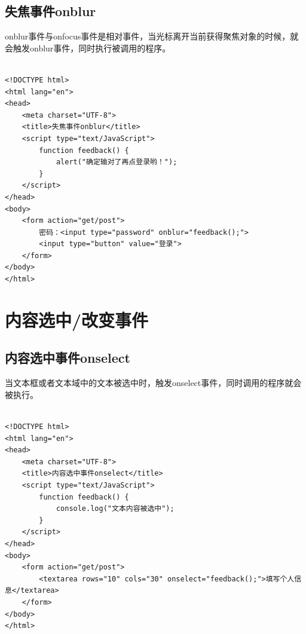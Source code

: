 \vspace{0.5cm}

\subsection{失焦事件onblur}

onblur事件与onfocus事件是相对事件，当光标离开当前获得聚焦对象的时候，就会触发onblur事件，同时执行被调用的程序。\\

\\

\begin{lstlisting}[style=htmlcssjs]
<!DOCTYPE html>
<html lang="en">
<head>
    <meta charset="UTF-8">
    <title>失焦事件onblur</title>
    <script type="text/JavaScript">
        function feedback() {
            alert("确定输对了再点登录哟！");
        }
    </script>
</head>
<body>
    <form action="get/post">
        密码：<input type="password" onblur="feedback();">
        <input type="button" value="登录">
    </form>
</body>
</html>
\end{lstlisting}

\newpage

\section{内容选中/改变事件}

\subsection{内容选中事件onselect}

当文本框或者文本域中的文本被选中时，触发onselect事件，同时调用的程序就会被执行。\\

\\

\begin{lstlisting}[style=htmlcssjs]
<!DOCTYPE html>
<html lang="en">
<head>
    <meta charset="UTF-8">
    <title>内容选中事件onselect</title>
    <script type="text/JavaScript">
        function feedback() {
            console.log("文本内容被选中");
        }
    </script>
</head>
<body>
    <form action="get/post">
        <textarea rows="10" cols="30" onselect="feedback();">填写个人信息</textarea>
    </form>
</body>
</html>
\end{lstlisting}

\vspace{0.5cm}

